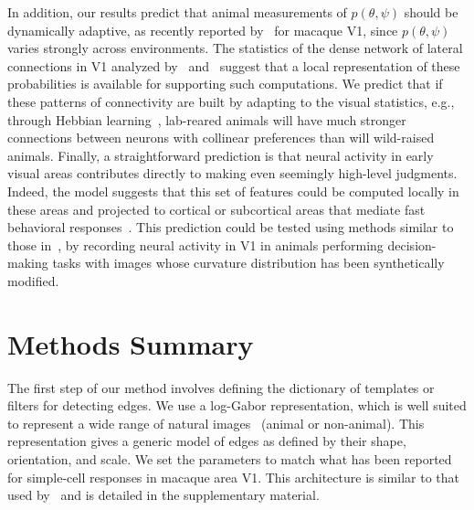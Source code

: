 \documentclass{article}%
\begin{document}
In addition, our results predict that animal measurements of $p(\theta,
\psi)$ should be dynamically adaptive, as recently reported
by~\citet{McManus11} for macaque V1, since 
$p(\theta, \psi)$ varies strongly across environments. 
  The statistics of the dense network of lateral connections in V1
  analyzed by~\citet{Bosking97} and~\citet{Hunt11} suggest that a
  local representation of these probabilities is available for
  supporting such computations.  We predict that if these patterns of
  connectivity are built by adapting to the visual statistics, e.g.,
  through Hebbian learning~\citep{Bednar12jpp}, lab-reared animals
  will have much stronger connections between neurons with collinear
  preferences than will wild-raised animals.
Finally, a straightforward prediction is 
that neural activity in early visual areas contributes
directly to making even seemingly high-level judgments.
Indeed, the model suggests that
this set of features could be computed locally in these areas and
projected to cortical or subcortical areas that mediate
fast behavioral responses~\citep{Rice14}.  This prediction could be tested using
methods similar to those in~\citet{Michel13}, by recording neural
activity in V1 in animals performing decision-making tasks with images
whose curvature distribution has been synthetically modified.
%
\section*{Methods Summary} %
The first step of our method involves defining the dictionary of templates or
filters for detecting edges. 
We use a log-Gabor representation, which is well suited to represent 
a wide range of natural images~\citep{Fischer07} (animal or non-animal). 
This representation gives a generic model of edges as defined by their shape,
orientation, and scale. 
We set the parameters to match what has been reported 
for simple-cell responses in macaque area V1. 
This architecture is similar to that used by~\citet{Geisler01} 
and is detailed in the supplementary material. 
\end{document}
